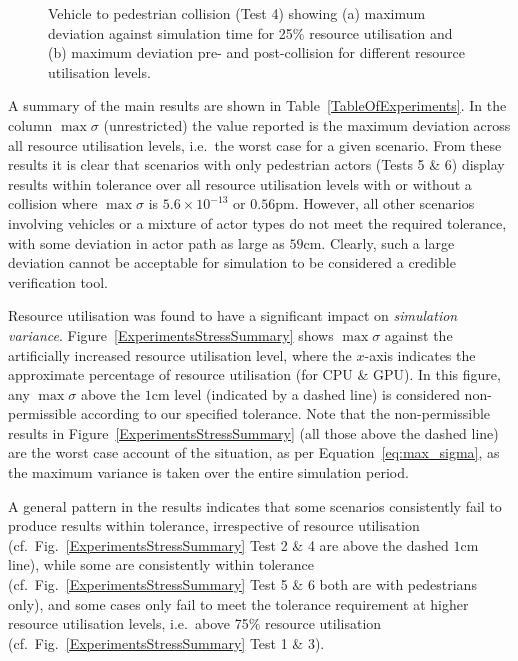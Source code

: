 \begin{figure}[h]
\begin{subfigure}{.49\textwidth}
        \caption{}
        \label{CarsPeopleCollisionPrePost}
    \end{subfigure}
    \caption{Vehicle to pedestrian collision (Test 4) showing (a) maximum deviation against simulation time for 25\% resource utilisation and (b) maximum deviation pre- and post-collision for different resource utilisation levels.}
\end{figure}

A summary of the main results are shown in Table~\ref{TableOfExperiments}.  In the column $\max\sigma$ (unrestricted) the value reported is the maximum deviation across all resource utilisation levels, i.e.\ the worst case for a given scenario. From these results it is clear that scenarios with only pedestrian actors (Tests 5 \& 6) display results within tolerance over all resource utilisation levels with or without a collision where $\max\sigma$ is $5.6\times10^{-13}$ or $0.56\si{\pico\metre}$. However, all other scenarios involving vehicles or a mixture of actor types do not meet the required tolerance, with some deviation in actor path as large as $59$cm. Clearly, such a large deviation cannot be acceptable for simulation to be considered a credible verification tool.

Resource utilisation was found to have a significant impact on \textit{simulation variance}. Figure~\ref{ExperimentsStressSummary} shows $\max\sigma$ against the artificially increased resource utilisation level, where the $x$-axis indicates the approximate percentage of resource utilisation (for CPU \& GPU). In this figure, any $\max\sigma$ above the $1$cm level (indicated by a dashed line) is considered non-permissible according to our specified tolerance. Note that the non-permissible results in Figure~\ref{ExperimentsStressSummary} (all those above the dashed line) are the worst case account of the situation, as per Equation~\ref{eq:max_sigma}, as the maximum variance is taken over the entire simulation period.

A general pattern in the results indicates that some scenarios consistently fail to produce results within tolerance, irrespective of resource utilisation (cf.\ Fig.~\ref{ExperimentsStressSummary} Test 2 \& 4 are above the dashed $1$cm line), while some are consistently within tolerance (cf.\ Fig.~\ref{ExperimentsStressSummary} Test 5 \& 6 both are with pedestrians only), and some cases only fail to meet the tolerance requirement at higher resource utilisation levels, i.e.\ above 75\% resource utilisation (cf.\ Fig.~\ref{ExperimentsStressSummary} Test 1 \& 3). 

